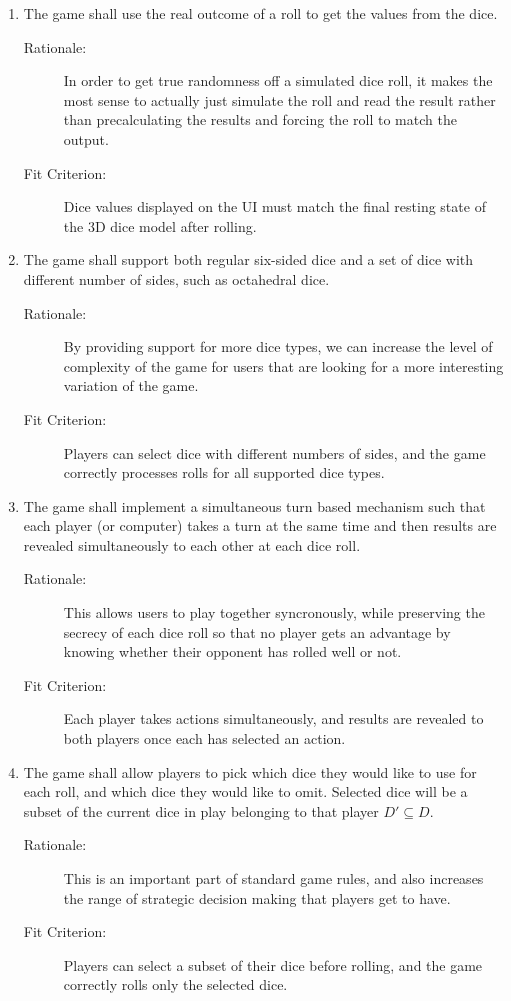 \begin{enumerate}[label=R\arabic*, start=1, left=0pt]
    \item \label{R4} The game shall use the real outcome of a roll to get the values from the dice.
    \begin{description}
        \item[Rationale:] In order to get true randomness off a simulated dice roll, it makes the most sense to actually just simulate the roll and read the result rather than precalculating the results and forcing the roll to match the output.
        \item[Fit Criterion:] Dice values displayed on the UI must match the final resting state of the 3D dice model after rolling.
    \end{description}

    \item \label{R5} The game shall support both regular six-sided dice and a set of dice with different number of sides, such as octahedral dice.
    \begin{description}
        \item[Rationale:] By providing support for more dice types, we can increase the level of complexity of the game for users that are looking for a more interesting variation of the game.
        \item[Fit Criterion:] Players can select dice with different numbers of sides, and the game correctly processes rolls for all supported dice types.
    \end{description}

    \item \label{R6} The game shall implement a simultaneous turn based mechanism such that each player (or computer) takes a turn at the same time and then results are revealed simultaneously to each other at each dice roll.
    \begin{description}
        \item[Rationale:] This allows users to play together syncronously, while preserving the secrecy of each dice roll so that no player gets an advantage by knowing whether their opponent has rolled well or not.
        \item[Fit Criterion:] Each player takes actions simultaneously, and results are revealed to both players once each has selected an action.
    \end{description}

    \item \label{R7} The game shall allow players to pick which dice they would like to use for each roll, and which dice they would like to omit. Selected dice will be a subset of the current dice in play belonging to that player $D' \subseteq D$.
    \begin{description}
        \item[Rationale:] This is an important part of standard game rules, and also increases the range of strategic decision making that players get to have.
        \item[Fit Criterion:] Players can select a subset of their dice before rolling, and the game correctly rolls only the selected dice.
    \end{description}


\end{enumerate}

